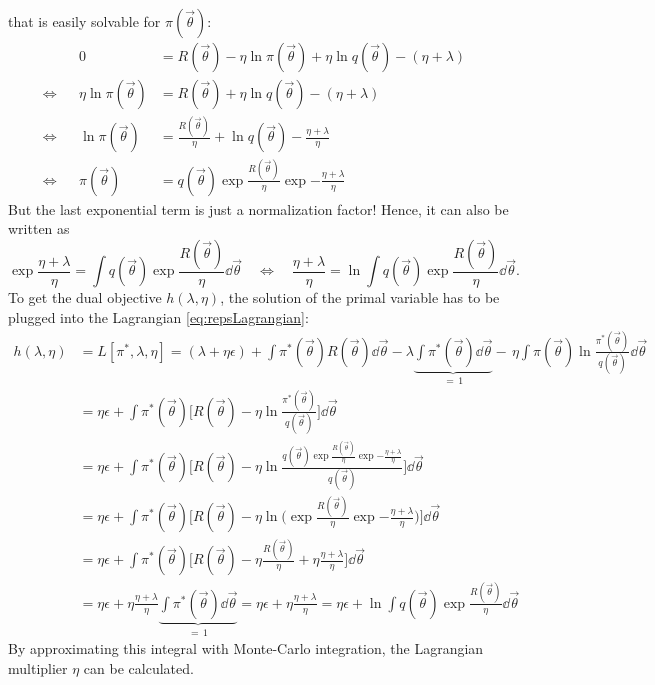 				that is easily solvable for \( \pi(\vec{\theta}) \):
				\begin{align*}
					&&
					0 &= R(\vec{\theta}) - \eta \ln \pi(\vec{\theta}) + \eta \ln q(\vec{\theta}) - (\eta + \lambda) & \\
					\iff&&
					\eta \ln \pi(\vec{\theta}) &= R(\vec{\theta}) + \eta \ln q(\vec{\theta}) - (\eta + \lambda) & \\
					\iff&&
					\ln \pi(\vec{\theta}) &= \frac{R(\vec{\theta})}{\eta} + \ln q(\vec{\theta}) - \frac{\eta + \lambda}{\eta} & \\
					\iff&&
					\pi(\vec{\theta}) &= q(\vec{\theta}) \exp{\frac{R(\vec{\theta})}{\eta}} \exp{-\frac{\eta + \lambda}{\eta}} &
				\end{align*}
				But the last exponential term is just a normalization factor! Hence, it can also be written as
				\begin{equation*}
					\exp{\frac{\eta + \lambda}{\eta}} = \int\! q(\vec{\theta}) \exp{\frac{R(\vec{\theta})}{\eta}} \dd{\vec{\theta}}
					\quad\iff\quad
					\frac{\eta + \lambda}{\eta} = \ln \int\! q(\vec{\theta}) \exp{\frac{R(\vec{\theta})}{\eta}} \dd{\vec{\theta}}.
				\end{equation*}
				To get the dual objective \( h(\lambda, \eta) \), the solution of the primal variable has to be plugged into the Lagrangian \eqref{eq:repsLagrangian}:
				\begin{align*}
					h(\lambda, \eta)
						&= L[\pi^\ast, \lambda, \eta]
						 = (\lambda + \eta\epsilon)
							+ \int\! \pi^\ast(\vec{\theta}) R(\vec{\theta}) \dd{\vec{\theta}}
							- \lambda \underbrace{\int\! \pi^\ast(\vec{\theta}) \dd{\vec{\theta}}}_{=\, 1}
							- \,\eta \int\! \pi(\vec{\theta}) \ln \frac{\pi^\ast(\vec{\theta})}{q(\vec{\theta})} \dd{\vec{\theta}} \\
						&= \eta\epsilon + \int\! \pi^\ast(\vec{\theta}) \bigg[ R(\vec{\theta}) - \eta \ln \frac{\pi^\ast(\vec{\theta})}{q(\vec{\theta})} \bigg] \dd{\vec{\theta}} \\
						&= \eta\epsilon + \int\! \pi^\ast(\vec{\theta}) \bigg[ R(\vec{\theta}) - \eta \ln \frac{q(\vec{\theta}) \exp{\frac{R(\vec{\theta})}{\eta}} \exp{-\frac{\eta + \lambda}{\eta}}}{q(\vec{\theta})} \bigg] \dd{\vec{\theta}} \\
						&= \eta\epsilon + \int\! \pi^\ast(\vec{\theta}) \bigg[ R(\vec{\theta}) - \eta \ln \bigg(\!\! \exp{\frac{R(\vec{\theta})}{\eta}} \exp{-\frac{\eta + \lambda}{\eta}} \!\bigg) \bigg] \dd{\vec{\theta}} \\
						&= \eta\epsilon + \int\! \pi^\ast(\vec{\theta}) \bigg[ R(\vec{\theta}) - \eta \frac{R(\vec{\theta})}{\eta} + \eta \frac{\eta + \lambda}{\eta} \bigg] \dd{\vec{\theta}} \\
						&= \eta\epsilon + \eta \frac{\eta + \lambda}{\eta} \underbrace{\int\! \pi^\ast(\vec{\theta}) \dd{\vec{\theta}}}_{=\, 1}
						 = \eta\epsilon + \eta \frac{\eta + \lambda}{\eta}
						 = \eta\epsilon + \ln \int\! q(\vec{\theta}) \exp{\frac{R(\vec{\theta})}{\eta}} \dd{\vec{\theta}}
				\end{align*}
				By approximating this integral with Monte-Carlo integration, the Lagrangian multiplier \(\eta\) can be calculated.

